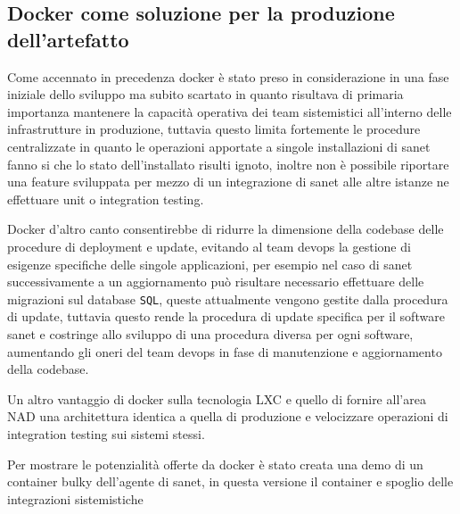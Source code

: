 \subsection{Docker come soluzione per la produzione dell'artefatto}
Come accennato in precedenza docker\cite{docker} è stato preso in considerazione in una fase iniziale dello sviluppo ma subito scartato in quanto risultava di primaria importanza mantenere la capacità operativa dei team sistemistici all'interno delle infrastrutture in produzione, tuttavia questo limita fortemente le procedure centralizzate in quanto le operazioni apportate a singole installazioni di sanet fanno si che lo stato dell'installato risulti ignoto, inoltre non è possibile riportare una feature sviluppata per mezzo di un integrazione di sanet alle altre istanze ne effettuare unit o integration testing.

Docker d'altro canto consentirebbe di ridurre la dimensione della codebase delle procedure di deployment e update, evitando al team devops la gestione di esigenze specifiche delle singole applicazioni, per esempio nel caso di sanet successivamente a un aggiornamento può risultare necessario effettuare delle migrazioni sul database \verb|SQL|, queste attualmente vengono gestite dalla procedura di update, tuttavia questo rende la procedura di update specifica per il software sanet e costringe allo sviluppo di una procedura diversa per ogni software, aumentando gli oneri del team devops in fase di manutenzione e aggiornamento della codebase.

Un altro vantaggio di docker\cite{docker} sulla tecnologia LXC\cite{lxc} e quello di fornire all'area NAD una architettura identica a quella di produzione e velocizzare operazioni di integration testing sui sistemi stessi.

Per mostrare le potenzialità offerte da docker è stato creata una demo di un container bulky dell'agente di sanet, in questa versione il container e spoglio delle integrazioni sistemistiche

